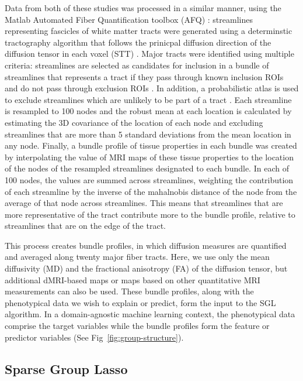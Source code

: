 Data from both of these studies was processed in a similar manner,
using the Matlab Automated Fiber Quantification toolbox (AFQ)
\cite{yeatman2012tract}: streamlines representing fascicles of white
matter tracts were generated using a determinstic tractography algorithm
that follows the prinicpal diffusion direction of the diffusion tensor
in each voxel (STT) \cite{basser2000vivo}. Major tracts were identified
using multiple criteria: streamlines are selected as candidates for
inclusion in a bundle of streamlines that represents a tract if they
pass through known inclusion ROIs and do not pass through exclusion
ROIs \cite{wakana2007reproducibility}. In addition, a probabilistic
atlas is used to exclude streamlines which are unlikely to be part of
a tract \cite{Hua2008-sh}. Each streamline is resampled to 100 nodes
and the robust mean at each location is calculated by estimating the 3D
covariance of the location of each node and excluding streamlines that
are more than 5 standard deviations from the mean location in any node.
Finally, a bundle profile of tissue properties in each bundle was created
by interpolating the value of MRI maps of these tissue properties to the
location of the nodes of the resampled streamlines designated to each
bundle. In each of 100 nodes, the values are summed across streamlines,
weighting the contribution of each streamline by the inverse of the
mahalnobis distance of the node from the average of that node across
streamlines. This means that streamlines that are more representative of
the tract contribute more to the bundle profile, relative to streamlines
that are on the edge of the tract.

This process creates bundle profiles, in which diffusion measures
are quantified and averaged along twenty major fiber tracts. Here,
we use only the mean diffusivity (MD) and the fractional anisotropy
(FA) of the diffusion tensor, but additional dMRI-based maps or maps
based on other quantitative MRI measurements can also be used. These
bundle profiles, along with the phenotypical data we wish to explain
or predict, form the input to the SGL algorithm. In a domain-agnostic
machine learning context, the phenotypical data comprise the target
variables while the bundle profiles form the feature or predictor
variables (See Fig~\ref{fig:group-structure}).

\subsection*{Sparse Group Lasso}

